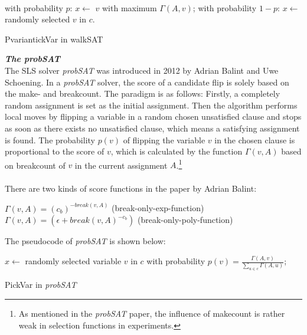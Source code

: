 \documentclass[12pt,a4paper,twoside]{scrartcl}
\numberwithin{equation}{section}
\begin{document}
\\
\begin{algorithm}[H]
  with probability $p$: $x \leftarrow$   $v$ with maximum $\Gamma(A,v)$; \;
  with probability $1-p$:  $x \leftarrow$  randomly selected $v$ in $c$. 
 \caption{PvariantickVar in walkSAT}
\end{algorithm}  

\emph{\textbf{The probSAT}}\\
The SLS solver \emph{probSAT} was introduced in 2012 by Adrian Balint and Uwe Schoening\cite{balint2016engineering}. In a \emph{probSAT} solver, the score of a candidate flip is solely based on the make- and breakcount. The paradigm is as follows: Firstly, a completely random assignment is set as the initial assignment. Then the algorithm performs local moves by flipping a variable in a random chosen unsatisfied clause and stops as soon as there exists no unsatisfied clause, which means a satisfying assignment is found. The probability $p(v)$ of flipping the variable $v$ in the chosen clause is proportional to the score of $v$, which is calculated by the function $\Gamma(v,A)$ based on breakcount of $v$ in the current assignment $A$.\footnote{As mentioned in the \emph{probSAT} paper, the influence of makecount is rather weak in selection functions in experiments.} 
\\
 \\ There are two kinds of score functions in the paper by Adrian Balint: \\
\begin{center}
$\Gamma(v,A) = (c_b)^{-break(v,A)}$ (break-only-exp-function) \\
$\Gamma(v,A)=(\epsilon +break(v,A)^{-c_b})$  (break-only-poly-function)\\
\end{center} 
\clearpage
The pseudocode of \emph{probSAT} is shown below:\\
\begin{algorithm}[H]
  $x \leftarrow$ randomly selected  variable $v$ in $c$ with probability $p(v) =\frac{\Gamma(A,v)}{\sum_{u \in c}\Gamma(A,u)}$; 
 \caption{PickVar in \emph{probSAT}}
\end{algorithm} 
\end{document}
